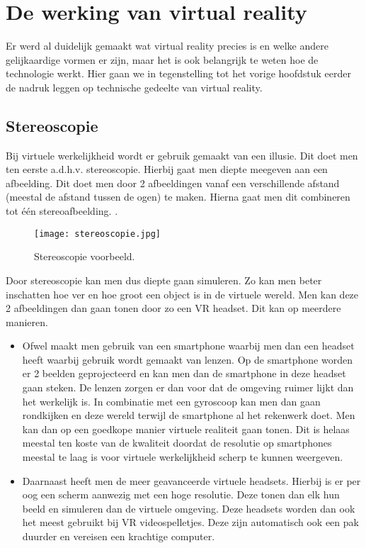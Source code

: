 \section{De werking van virtual reality}
\label{sec:hoe-werkt-vr}
Er werd al duidelijk gemaakt wat virtual reality precies is en welke andere gelijkaardige vormen er zijn, maar het is ook belangrijk te weten hoe de technologie werkt. Hier gaan we in tegenstelling tot het vorige hoofdstuk eerder de nadruk leggen op technische gedeelte van virtual reality.

\subsection{Stereoscopie}
\label{subsec:stereoscopie}
Bij virtuele werkelijkheid wordt er gebruik gemaakt van een illusie. Dit doet men ten eerste a.d.h.v. stereoscopie. Hierbij gaat men diepte meegeven aan een afbeelding. Dit doet men door 2 afbeeldingen vanaf een verschillende afstand (meestal de afstand tussen de ogen) te maken. Hierna gaat men dit combineren tot één stereoafbeelding. \autocite{Rouse2011}.

\begin{figure}
	\centering
	\texttt{[image: stereoscopie.jpg]}
	\caption{Stereoscopie voorbeeld.}
	\label{fig:stereoscopie}
\end{figure}

Door stereoscopie kan men dus diepte gaan simuleren. Zo kan men beter inschatten hoe ver en hoe groot een object is in de virtuele wereld. Men kan deze 2 afbeeldingen dan gaan tonen door zo een VR headset. Dit kan op meerdere manieren.
\begin{itemize}
	\item Ofwel maakt men gebruik van een smartphone waarbij men dan een headset heeft waarbij gebruik wordt gemaakt van lenzen. Op de smartphone worden er 2 beelden geprojecteerd en kan men dan de smartphone in deze headset gaan steken. De lenzen zorgen er dan voor dat de omgeving ruimer lijkt dan het werkelijk is. In combinatie met een gyroscoop kan men dan gaan rondkijken en deze wereld terwijl de smartphone al het rekenwerk doet. Men kan dan op een goedkope manier virtuele realiteit gaan tonen. Dit is helaas meestal ten koste van de kwaliteit doordat de resolutie op smartphones meestal te laag is voor virtuele werkelijkheid scherp te kunnen weergeven.
	
	\item Daarnaast heeft men de meer geavanceerde virtuele headsets. Hierbij is er per oog een scherm aanwezig met een hoge resolutie. Deze tonen dan elk hun beeld en simuleren dan de virtuele omgeving. Deze headsets worden dan ook het meest gebruikt bij VR videospelletjes. Deze zijn automatisch ook een pak duurder en vereisen een krachtige computer.
\end{itemize}

